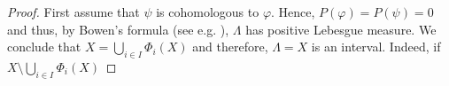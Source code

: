 \documentclass[11pt]{amsart}
\newcommand{\1}{1}
\newcommand{\N}{\mathbb{N}}
\begin{document}
\begin{proof} %
First assume that $\psi$ is cohomologous to $\varphi$. Hence, $P(\varphi)=P(\psi)=0$
and thus, by Bowen's formula (see e.g. \cite[Theorem 4.2.11]{MauUrb03}),
$\Lambda$ has positive Lebesgue measure. We conclude that $X=\bigcup_{i\in I}\Phi_{i}(X)$
and therefore, $\Lambda=X$ is an interval. Indeed, if $X\setminus\bigcup_{i\in I}\Phi_{i}(X)$

\end{proof}
\end{document}
